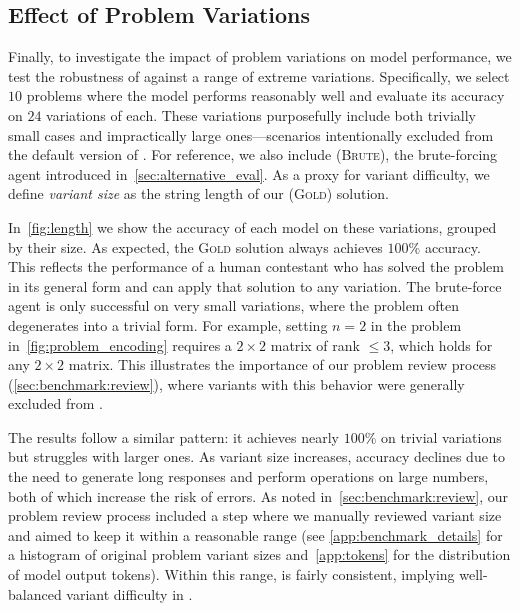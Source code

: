 \subsection{Effect of Problem Variations} \label{sec:problem_variations}

Finally, to investigate the impact of problem variations on model performance, we test the robustness of \geminithink{} against a range of extreme variations. Specifically, we select $10$ problems where the model performs reasonably well and evaluate its accuracy on $24$ variations of each. These variations purposefully include both trivially small cases and impractically large ones---scenarios intentionally excluded from the default version of \mc{}. For reference, we also include \claudesonnet{} (\textsc{Brute}), the brute-forcing agent introduced in~\cref{sec:alternative_eval}. 
As a proxy for variant difficulty, we define \emph{variant size} as the string length of our (\textsc{Gold}) solution. 

In~\cref{fig:length} we show the accuracy of each model on these variations, grouped by their size. As expected, the \textsc{Gold} solution always achieves $100\%$ accuracy. This reflects the performance of a human contestant who has solved the problem in its general form and can apply that solution to any variation. The brute-force agent is only successful on very small variations, where the problem often degenerates into a trivial form.
For example, setting $n=2$ in the problem in~\cref{fig:problem_encoding} requires a $2 \times 2$ matrix of rank $\leq 3$, which holds for any $2 \times 2$ matrix.
This illustrates the importance of our problem review process (\cref{sec:benchmark:review}), where variants with this behavior were generally excluded from \mc{}.

The \geminithink{} results follow a similar pattern: it achieves nearly $100\%$ on trivial variations but struggles with larger ones.
As variant size increases, accuracy declines due to the need to generate long responses and perform operations on large numbers, both of which increase the risk of errors. As noted in~\cref{sec:benchmark:review}, our problem review process included a step where we manually reviewed variant size and aimed to keep it within a reasonable range (see \cref{app:benchmark_details} for a histogram of original problem variant sizes and~\cref{app:tokens} for the distribution of model output tokens).
Within this range, \geminithink{} is fairly consistent, implying well-balanced variant difficulty in \mc{}.

